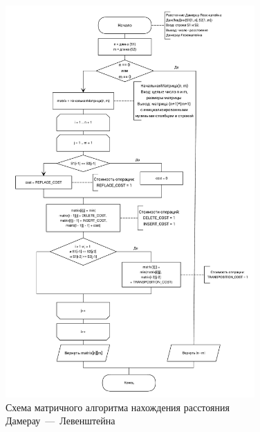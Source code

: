 \begin{figure}[H]
\centering
\includegraphics[width=0.85\textwidth]{inc/img/damerau_levenshtein_dynamic.pdf}
\caption{Схема матричного алгоритма нахождения расстояния Дамерау~---~Левенштейна}
\label{fig:dyn_dam_lev}
\end{figure}

